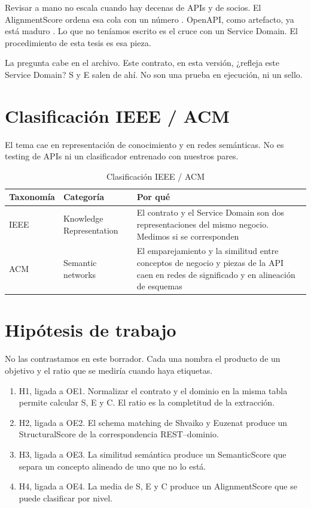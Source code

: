 Revisar a mano no escala cuando hay decenas de APIs y de socios. El AlignmentScore ordena esa cola con un número \cite{Shabbir2025}. OpenAPI, como artefacto, ya está maduro \cite{Casas2021}. Lo que no teníamos escrito es el cruce con un Service Domain. El procedimiento de esta tesis es esa pieza.

La pregunta cabe en el archivo. Este contrato, en esta versión, ¿refleja este Service Domain? S y E salen de ahí. No son una prueba en ejecución, ni un sello.

\section{Clasificación IEEE / ACM}

El tema cae en representación de conocimiento y en redes semánticas. No es testing de APIs ni un clasificador entrenado con nuestros pares.

\begin{table}[H]
  \centering
  \caption{Clasificación IEEE / ACM}
  \label{tab:clasificacion}
  \begin{tabular}{@{}p{}p{}p{}@{}}
    \toprule
    Taxonomía & Categoría & Por qué \\
    \midrule
    IEEE & Knowledge Representation &
    El contrato y el Service Domain son dos representaciones del mismo negocio. Medimos si se corresponden \\
    ACM & Semantic networks &
    El emparejamiento y la similitud entre conceptos de negocio y piezas de la API caen en redes de significado y en alineación de esquemas \\
    \bottomrule
  \end{tabular}
\end{table}

\section{Hipótesis de trabajo}

No las contrastamos en este borrador. Cada una nombra el producto de un objetivo y el ratio que se mediría cuando haya etiquetas.

\begin{enumerate}
  \item H1, ligada a OE1. Normalizar el contrato y el dominio en la misma tabla permite calcular S, E y C. El ratio es la completitud de la extracción.
  \item H2, ligada a OE2. El schema matching de Shvaiko y Euzenat \cite{Shvaiko2005} produce un StructuralScore de la correspondencia REST--dominio.
  \item H3, ligada a OE3. La similitud semántica \cite{ElBayadh2015,Chandrasekaran2022} produce un SemanticScore que separa un concepto alineado de uno que no lo está.
  \item H4, ligada a OE4. La media de S, E y C produce un AlignmentScore que se puede clasificar por nivel.
\end{enumerate}


